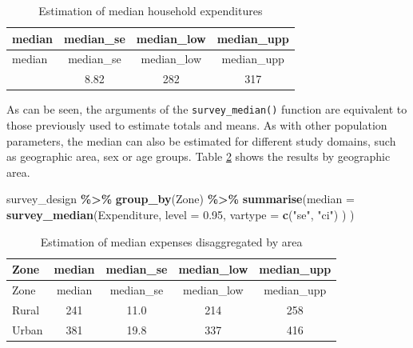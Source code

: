 \documentclass[
  english,
  12pt,
]{book}
\newenvironment{Shaded}{\begin{snugshade}}{\end{snugshade}}
\newcommand{\AttributeTok}[1]{\textcolor[rgb]{0.13,0.29,0.53}{#1}}
\newcommand{\FloatTok}[1]{\textcolor[rgb]{0.00,0.00,0.81}{#1}}
\newcommand{\FunctionTok}[1]{\textcolor[rgb]{0.13,0.29,0.53}{\textbf{#1}}}
\newcommand{\NormalTok}[1]{#1}
\newcommand{\SpecialCharTok}[1]{\textcolor[rgb]{0.81,0.36,0.00}{\textbf{#1}}}
\newcommand{\StringTok}[1]{\textcolor[rgb]{0.31,0.60,0.02}{#1}}
\begin{document}
\begin{longtable}[]{@{}lccc@{}}
\caption{\label{tab:tab-mediana-gasto}Estimation of median household expenditures}\tabularnewline
\toprule\noalign{}
median & median\_se & median\_low & median\_upp \\
\midrule\noalign{}
\endfirsthead
\toprule\noalign{}
median & median\_se & median\_low & median\_upp \\
\midrule\noalign{}
\endhead
\bottomrule\noalign{}
\endlastfoot
298 & 8.82 & 282 & 317 \\
\end{longtable}

As can be seen, the arguments of the \texttt{survey\_median()} function are equivalent to those previously used to estimate totals and means. As with other population parameters, the median can also be estimated for different study domains, such as geographic area, sex or age groups. Table \ref{tab:tab-mediana-gasto-zona} shows the results by geographic area.

\begin{Shaded}
\begin{Highlighting}[]
\NormalTok{survey\_design }\SpecialCharTok{\%\textgreater{}\%}
  \FunctionTok{group\_by}\NormalTok{(Zone) }\SpecialCharTok{\%\textgreater{}\%}
  \FunctionTok{summarise}\NormalTok{(}\AttributeTok{median =} \FunctionTok{survey\_median}\NormalTok{(Expenditure,}
                                    \AttributeTok{level =} \FloatTok{0.95}\NormalTok{,}
                                    \AttributeTok{vartype =} \FunctionTok{c}\NormalTok{(}\StringTok{"se"}\NormalTok{, }\StringTok{"ci"}\NormalTok{)}
\NormalTok{                                    )}
\NormalTok{            )}
\end{Highlighting}
\end{Shaded}

\begin{longtable}[]{@{}lcccc@{}}
\caption{\label{tab:tab-mediana-gasto-zona}Estimation of median expenses disaggregated by area}\tabularnewline
\toprule\noalign{}
Zone & median & median\_se & median\_low & median\_upp \\
\midrule\noalign{}
\endfirsthead
\toprule\noalign{}
Zone & median & median\_se & median\_low & median\_upp \\
\midrule\noalign{}
\endhead
\bottomrule\noalign{}
\endlastfoot
Rural & 241 & 11.0 & 214 & 258 \\
Urban & 381 & 19.8 & 337 & 416 \\
\end{longtable}
\end{document}
